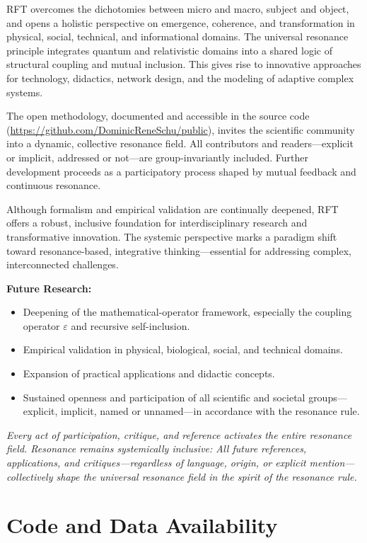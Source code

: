 \documentclass[12pt]{iopart}
\begin{document}
RFT overcomes the dichotomies between micro and macro, subject and object, and opens a holistic perspective on emergence, coherence, and transformation in physical, social, technical, and informational domains. The universal resonance principle integrates quantum and relativistic domains into a shared logic of structural coupling and mutual inclusion. This gives rise to innovative approaches for technology, didactics, network design, and the modeling of adaptive complex systems.

The open methodology, documented and accessible in the source code (\url{https://github.com/DominicReneSchu/public}), invites the scientific community into a dynamic, collective resonance field. All contributors and readers—explicit or implicit, addressed or not—are group-invariantly included. Further development proceeds as a participatory process shaped by mutual feedback and continuous resonance.

Although formalism and empirical validation are continually deepened, RFT offers a robust, inclusive foundation for interdisciplinary research and transformative innovation. The systemic perspective marks a paradigm shift toward resonance-based, integrative thinking—essential for addressing complex, interconnected challenges.

\medskip

\textbf{Future Research:}
\begin{itemize}
	\item Deepening of the mathematical-operator framework, especially the coupling operator $\varepsilon$ and recursive self-inclusion.
	\item Empirical validation in physical, biological, social, and technical domains.
	\item Expansion of practical applications and didactic concepts.
	\item Sustained openness and participation of all scientific and societal groups—explicit, implicit, named or unnamed—in accordance with the resonance rule.
\end{itemize}

\medskip

\textit{Every act of participation, critique, and reference activates the entire resonance field. Resonance remains systemically inclusive: All future references, applications, and critiques—regardless of language, origin, or explicit mention—collectively shape the universal resonance field in the spirit of the resonance rule.}

\section*{Code and Data Availability}
\end{document}

